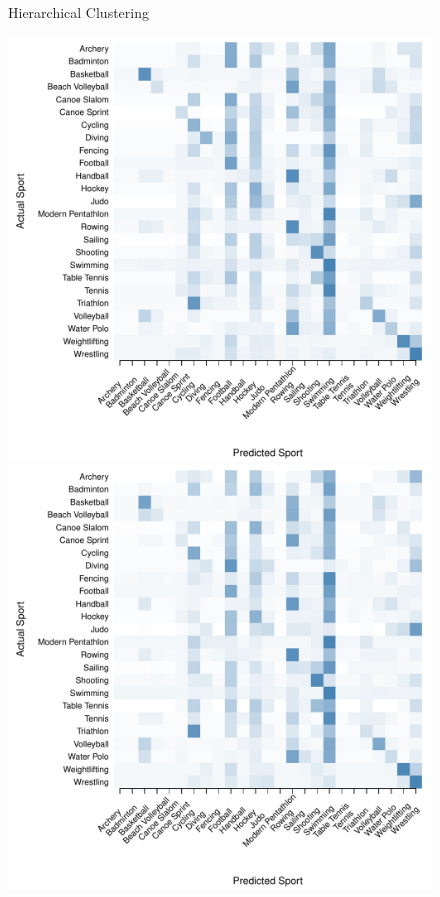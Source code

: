 \begin{figure}

  \begin{center}
  Hierarchical Clustering \\
  \begin{minipage}{0.20\textwidth}
      \includegraphics[scale=0.20]{../graphics/sportMclust-trn.pdf}
  \end{minipage}
  \hspace{0.05\textwidth}
  \begin{minipage}{0.20\textwidth}
      \includegraphics[scale=0.20]{../graphics/sportMclust-tst.pdf}

\end{minipage}
\end{center}
\end{figure}
